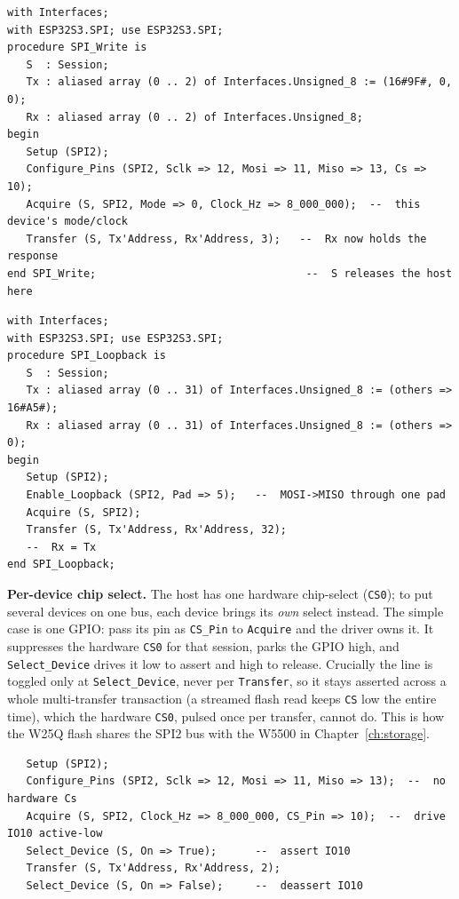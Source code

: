 \begin{lstlisting}
with Interfaces;
with ESP32S3.SPI; use ESP32S3.SPI;
procedure SPI_Write is
   S  : Session;
   Tx : aliased array (0 .. 2) of Interfaces.Unsigned_8 := (16#9F#, 0, 0);
   Rx : aliased array (0 .. 2) of Interfaces.Unsigned_8;
begin
   Setup (SPI2);
   Configure_Pins (SPI2, Sclk => 12, Mosi => 11, Miso => 13, Cs => 10);
   Acquire (S, SPI2, Mode => 0, Clock_Hz => 8_000_000);  --  this device's mode/clock
   Transfer (S, Tx'Address, Rx'Address, 3);   --  Rx now holds the response
end SPI_Write;                                 --  S releases the host here
\end{lstlisting}

\begin{lstlisting}
with Interfaces;
with ESP32S3.SPI; use ESP32S3.SPI;
procedure SPI_Loopback is
   S  : Session;
   Tx : aliased array (0 .. 31) of Interfaces.Unsigned_8 := (others => 16#A5#);
   Rx : aliased array (0 .. 31) of Interfaces.Unsigned_8 := (others => 0);
begin
   Setup (SPI2);
   Enable_Loopback (SPI2, Pad => 5);   --  MOSI->MISO through one pad
   Acquire (S, SPI2);
   Transfer (S, Tx'Address, Rx'Address, 32);
   --  Rx = Tx
end SPI_Loopback;
\end{lstlisting}

\textbf{Per-device chip select.}
The host has one hardware chip-select (\texttt{CS0}); to put several devices on one
bus, each device brings its \emph{own} select instead. The simple case is one
GPIO: pass its pin as \texttt{CS\_Pin} to \texttt{Acquire} and the driver owns it.
It suppresses the hardware \texttt{CS0} for that session, parks the GPIO high,
and \texttt{Select\_Device} drives it low to assert and high to release. Crucially
the line is toggled only at \texttt{Select\_Device}, never per \texttt{Transfer}, so
it stays asserted across a whole multi-transfer transaction (a streamed flash read
keeps \texttt{CS} low the entire time), which the hardware \texttt{CS0}, pulsed
once per transfer, cannot do. This is how the W25Q flash shares the SPI2 bus with
the W5500 in Chapter~\ref{ch:storage}.

\begin{lstlisting}
   Setup (SPI2);
   Configure_Pins (SPI2, Sclk => 12, Mosi => 11, Miso => 13);  --  no hardware Cs
   Acquire (S, SPI2, Clock_Hz => 8_000_000, CS_Pin => 10);  --  drive IO10 active-low
   Select_Device (S, On => True);      --  assert IO10
   Transfer (S, Tx'Address, Rx'Address, 2);
   Select_Device (S, On => False);     --  deassert IO10
\end{lstlisting}


